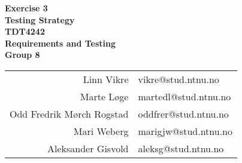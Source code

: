 \begin{titlepage}
\begin{center}

{\Huge \bf Exercise 3} \\[0.5cm]
{\Huge \bf Testing Strategy} \\[3.0cm]

{\Large \bf TDT4242} \\ [0.5cm]
{\Large \bf Requirements and Testing} \\[2.0cm]


\vspace{10cm}
{\Large \bf Group 8} \\
\vspace{1cm}

\begin{table}[H]
	\centering
	\begin{tabular}{ r  l }
		Linn Vikre & vikre@stud.ntnu.no \\ 
		Marte Løge & martedl@stud.ntnu.no \\ 
		Odd Fredrik Mørch Rogstad & oddfrer@stud.ntnu.no \\ 
		Mari Weberg & marigjw@stud.ntnu.no \\ 
		Aleksander Gisvold & aleksg@stud.ntnu.no \\ 
	\end{tabular}
\end{table}

\end{center}
\end{titlepage}